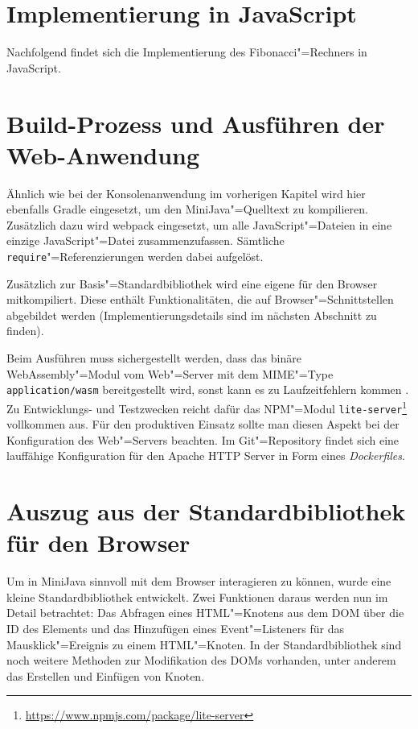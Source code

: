 \section{Implementierung in JavaScript}

Nachfolgend findet sich die Implementierung des Fibonacci"=Rechners in JavaScript.


\section{Build-Prozess und Ausführen der Web-Anwendung}

Ähnlich wie bei der Konsolenanwendung im vorherigen Kapitel wird hier ebenfalls Gradle eingesetzt, um den MiniJava"=Quelltext zu kompilieren. Zusätzlich dazu wird webpack \cite{Webpack} eingesetzt, um alle JavaScript"=Dateien in eine einzige JavaScript"=Datei zusammenzufassen. Sämtliche \lstinline{require}"=Referenzierungen werden dabei aufgelöst.

Zusätzlich zur Basis"=Standardbibliothek wird eine eigene für den Browser mitkompiliert. Diese enthält Funktionalitäten, die auf Browser"=Schnittstellen abgebildet werden (Implementierungsdetails sind im nächsten Abschnitt zu finden).

Beim Ausführen muss sichergestellt werden, dass das binäre WebAssembly"=Modul vom Web"=Server mit dem MIME"=Type \lstinline{application/wasm} bereitgestellt wird, sonst kann es zu Laufzeitfehlern kommen \cite{MDNWebAssembly}. Zu Entwicklungs- und Testzwecken reicht dafür das NPM"=Modul \lstinline{lite-server}\footnote{\url{https://www.npmjs.com/package/lite-server}} vollkommen aus. Für den produktiven Einsatz sollte man diesen Aspekt bei der Konfiguration des Web"=Servers beachten. Im Git"=Repository findet sich eine lauffähige Konfiguration für den Apache HTTP Server in Form eines \emph{Dockerfiles}.

\section{Auszug aus der Standardbibliothek für den Browser}

Um in MiniJava sinnvoll mit dem Browser interagieren zu können, wurde eine kleine Standardbibliothek entwickelt. Zwei Funktionen daraus werden nun im Detail betrachtet: Das Abfragen eines HTML"=Knotens aus dem DOM über die ID des Elements und das Hinzufügen eines Event"=Listeners für das Mausklick"=Ereignis zu einem HTML"=Knoten. In der Standardbibliothek sind noch weitere Methoden zur Modifikation des DOMs vorhanden, unter anderem das Erstellen und Einfügen von Knoten.

